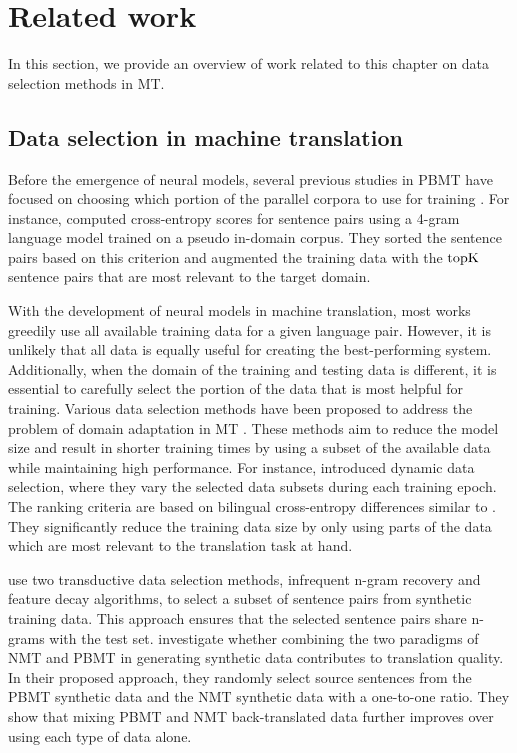 \section{Related work} \label{btrelated}

In this section, we provide an overview of work related to this chapter on data selection methods in MT.

\subsection{Data selection in machine translation}

Before the emergence of neural models, several previous studies in PBMT have focused on choosing which portion of the parallel corpora to use for training \citep{moore-lewis-2010-intelligent,wang-etal-2013-edit}. 
For instance, \citet{D11-1033} computed cross-entropy scores for sentence pairs using a 4-gram language model trained on a pseudo in-domain corpus.
They sorted the sentence pairs based on this criterion and augmented the training data with the $\operatorname*{topK}$ sentence pairs that are most relevant to the target domain.

With the development of neural models in machine translation, most works greedily use all available training data for a given language pair. 
However, it is unlikely that all data is equally useful for creating the best-performing system.
Additionally, when the domain of the training and testing data is different, it is essential to carefully select the portion of the data that is most helpful for training. 
Various data selection methods have been proposed to address the problem of domain adaptation in MT \citep{silva-etal-2018-extracting,wang-etal-2019-dynamically}.  
These methods aim to reduce the model size and result in shorter training times by using a subset of the available data while maintaining high performance.
For instance, \citet{vanderwees-bisazza-monz:2017:EMNLP2017} introduced dynamic data selection, where they vary the selected data subsets during each training epoch. The ranking criteria are based on bilingual cross-entropy differences similar to \citet{D11-1033}.
They significantly reduce the training data size by only using parts of the data which are most relevant to the translation task at hand. 

\citet{2019arXiv190607808P} use two transductive data selection methods, infrequent n-gram recovery and feature decay algorithms, to select a subset of sentence pairs from synthetic training data. 
This approach ensures that the selected sentence pairs share n-grams with the test set.
\citet{DBLP:journals/corr/abs-1909-03750} investigate whether combining the two paradigms of NMT and PBMT in generating synthetic data contributes to translation quality. 
In their proposed approach, they randomly select source sentences from the PBMT synthetic data and the NMT synthetic data with a one-to-one ratio.
They show that mixing PBMT and NMT back-translated data further improves over using each type of data alone.


